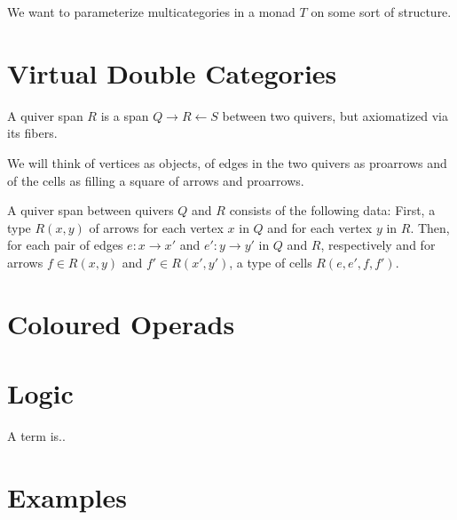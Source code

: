 %

We want to parameterize multicategories in a monad $T$ on some sort of structure. 

\section{Virtual Double Categories}

A quiver span $R$ is a span $Q \xrightarrow{} R \xleftarrow{} S$ between two quivers, but axiomatized via its fibers.

We will think of vertices as objects, of edges in the two quivers as proarrows and of the cells as filling a square of arrows and proarrows.

\begin{definition}
    A quiver span between quivers $Q$ and $R$ consists of the following data: First, a type $R(x,y)$ of arrows for each vertex $x$ in $Q$ and for each vertex $y$ in $R$. Then, for each pair of edges $e : x \to x'$ and $e' : y \to y'$ in $Q$ and $R$, respectively and for arrows $f \in R(x,y)$ and $f' \in R(x',y')$, a type of cells $R(e,e',f,f')$.
\end{definition}



\example{}

\section{Coloured Operads}



\section{Logic}

\begin{definition}
    A term is..
\end{definition}

\section{Examples}